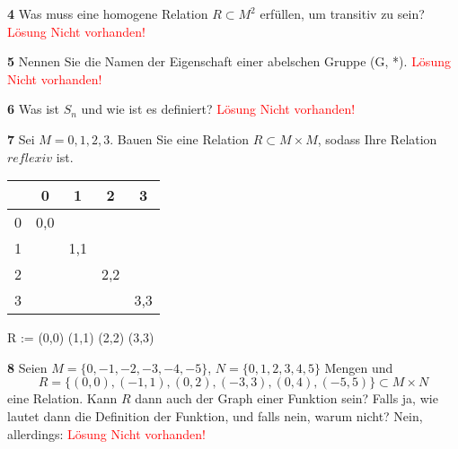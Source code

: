 \documentclass[11pt]{article}
\begin{document}
    \textbf{4} Was muss eine homogene Relation \( R \subset M^2 \) erfüllen, um transitiv zu sein?\newline
    \textcolor{red}{Lösung Nicht vorhanden!}\newline

    \textbf{5} Nennen Sie die Namen der Eigenschaft einer abelschen Gruppe (G, *).\newline
    \textcolor{red}{Lösung Nicht vorhanden!}\newline

    \textbf{6} Was ist $S_n$ und wie ist es definiert?\newline
    \textcolor{red}{Lösung Nicht vorhanden!}\newline

    \textbf{7} Sei $M = {0,1,2,3}$. Bauen Sie eine Relation $R \subset M \times M$, sodass Ihre Relation $reflexiv$ ist.\newline
\begin{tabular}{c|cccc}
    & 0 & 1 & 2 & 3 \\
    \hline
    0 & 0,0 & & & \\
    1 & & 1,1 & & \\
    2 & & & 2,2 & \\
    3 & & & & 3,3 \\
\end{tabular}\newline
R := {(0,0) (1,1) (2,2) (3,3)}\newline


    \textbf{8} Seien \( M = \{0,-1,-2,-3,-4,-5\} \), \( N = \{0,1,2,3,4,5\} \) Mengen und
    \[ R = \{(0,0),(-1,1),(0,2),(-3,3),(0,4),(-5,5)\} \subset M \times N \]
    eine Relation. Kann \( R \) dann auch der Graph einer Funktion sein? Falls ja, wie lautet dann die Definition der Funktion, und falls nein, warum nicht?\newline
    Nein, allerdings: \textcolor{red}{Lösung Nicht vorhanden!}\newline
\end{document}
